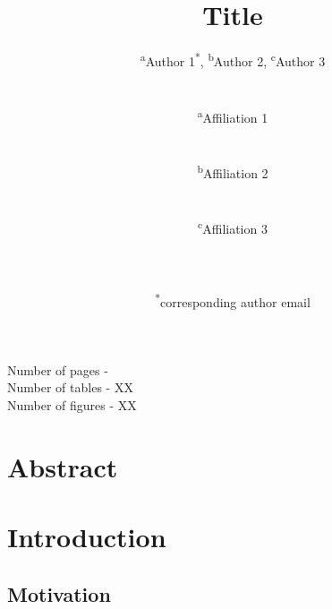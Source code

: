 \documentclass[11pt,a4paper]{article}
\begin{document}
\begin{titlepage}
    \title{Title}
    \author{
        \textsuperscript{a}Author 1\textsuperscript{*}, 
        \textsuperscript{b}Author 2, 
        \textsuperscript{c}Author 3
        \\ \\ \\
        \textsuperscript{a}Affiliation 1\\ 
        \\ \\
        \textsuperscript{b}Affiliation 2\\ 
        \\ \\
        \textsuperscript{c}Affiliation 3\\
        \\ \\ \\
        \textsuperscript{*}corresponding author email
    }
\clearpage %
\maketitle
\vspace*{\fill}
\begin{flushright}{
        \noindent Number of pages - \pageref{LastPage} \\
        \noindent Number of tables - XX \\
        \noindent Number of figures - XX
}
\end{flushright}
\thispagestyle{empty} %
\end{titlepage}

\onehalfspacing %
\linenumbers %
\pagewiselinenumbers %
\modulolinenumbers[3] %

\section*{Abstract} \label{sec-abstract}

\newpage

\printnoidxglossary

\newpage

\section{Introduction} \label{sec-introduction}
\subsection{Motivation} \label{sec-motivation}
\end{document}
